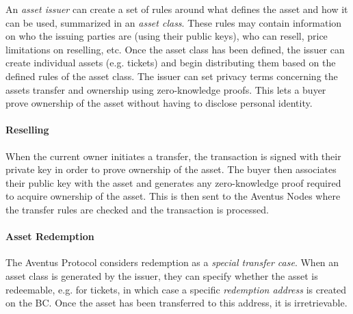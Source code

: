 An \textit{asset issuer} can create a set of rules around what defines the asset and how it can be used, summarized in an \textit{asset class}. These rules may contain information on who the issuing parties are (using their public keys), who can resell, price limitations on reselling, etc. Once the asset class has been defined, the issuer can create individual assets (e.g. tickets) and begin distributing them based on the defined rules of the asset class. The issuer can set privacy terms concerning the assets transfer and ownership using zero-knowledge proofs. This lets a buyer prove ownership of the asset without having to disclose personal identity.

\paragraph{Reselling}

When the current owner initiates a transfer, the transaction is signed with their private key in order to prove ownership of the asset. The buyer then associates their public key with the asset and generates any zero-knowledge proof required to acquire ownership of the asset. This is then sent to the Aventus Nodes where the transfer rules are checked and the transaction is processed.

\paragraph{Asset Redemption}

The Aventus Protocol considers redemption as a \textit{special transfer case}. When an asset class is generated by the issuer, they can specify whether the asset is redeemable, e.g. for tickets, in which case a specific \textit{redemption address} is created on the BC. Once the asset has been transferred to this address, it is irretrievable.

